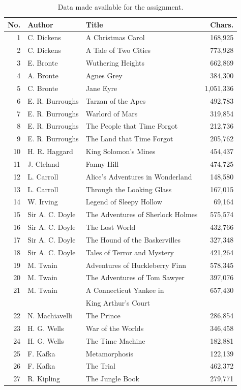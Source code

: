 \documentclass[conference]{IEEEtran}
\begin{document}
\begin{table}
\caption{Data made available for the assignment.\label{tab:data}}
\vspace{-18pt}
\begin{center}
\begin{tabular}{r@{\hspace{1.1em}}l@{\hspace{1.1em}}l@{\hspace{0.75em}}r}
\hline
No. & Author & Title & Chars. \\
\hline
1  & C. Dickens & A Christmas Carol & 168,925 \\
2  & C. Dickens & A Tale of Two Cities & 773,928 \\
3  & E. Bronte & Wuthering Heights & 662,869 \\
4  & A. Bronte & Agnes Grey & 384,300 \\
5  & C. Bronte & Jane Eyre & 1,051,336 \\
6  & E. R. Burroughs & Tarzan of the Apes & 492,783 \\
7  & E. R. Burroughs & Warlord of Mars & 319,854 \\
8  & E. R. Burroughs & The People that Time Forgot & 212,736 \\
9  & E. R. Burroughs & The Land that Time Forgot & 205,762 \\
10 & H. R. Haggard & King Solomon's Mines & 454,437 \\
11 & J. Cleland & Fanny Hill & 474,725 \\
12 & L. Carroll & Alice's Adventures in Wonderland & 148,580 \\
13 & L. Carroll & Through the Looking Glass & 167,015 \\
14 & W. Irving & Legend of Sleepy Hollow & 69,164 \\
15 & Sir A. C. Doyle & The Adventures of Sherlock Holmes & 575,574 \\
16 & Sir A. C. Doyle & The Lost World & 432,766 \\
17 & Sir A. C. Doyle & The Hound of the Baskervilles & 327,348 \\
18 & Sir A. C. Doyle & Tales of Terror and Mystery & 421,264 \\
19 & M. Twain & Adventures of Huckleberry Finn & 578,345 \\
20 & M. Twain & The Adventures of Tom Sawyer & 397,076 \\
21 & M. Twain & A Connecticut Yankee in & 657,430 \\
   &          & King Arthur's Court & \\
22 & N. Machiavelli & The Prince & 286,854 \\
23 & H. G. Wells & War of the Worlds & 346,458 \\
24 & H. G. Wells & The Time Machine & 182,881 \\
25 & F. Kafka & Metamorphosis & 122,139 \\
26 & F. Kafka & The Trial & 462,372 \\
27 & R. Kipling & The Jungle Book & 279,771 \\
\hline
\end{tabular}
\end{center}
\end{table}
\end{document}
